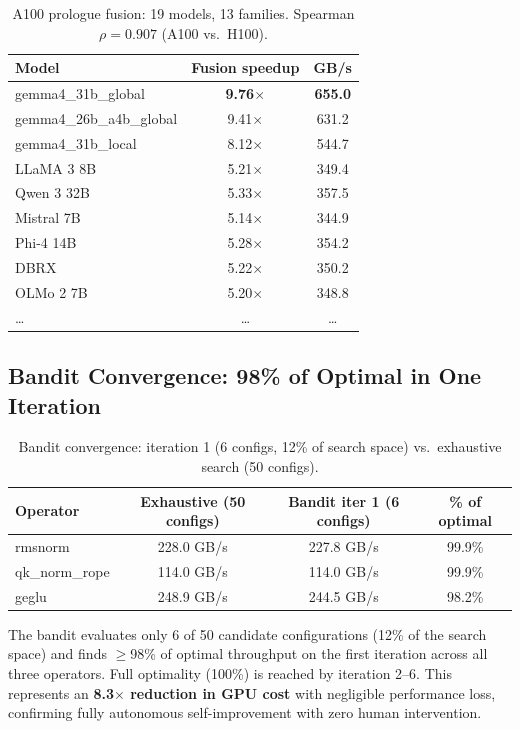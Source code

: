 \documentclass{article}
\begin{document}
\begin{table}[t]
\centering
\caption{A100 prologue fusion: 19 models, 13 families. Spearman $\rho = 0.907$ (A100 vs.\ H100).}
\label{tab:a100-19model}
\small
\begin{tabular}{@{}lcc@{}}
\toprule
Model & Fusion speedup & GB/s \\
\midrule
gemma4\_31b\_global & \textbf{9.76$\times$} & \textbf{655.0} \\
gemma4\_26b\_a4b\_global & 9.41$\times$ & 631.2 \\
gemma4\_31b\_local & 8.12$\times$ & 544.7 \\
LLaMA 3 8B & 5.21$\times$ & 349.4 \\
Qwen 3 32B & 5.33$\times$ & 357.5 \\
Mistral 7B & 5.14$\times$ & 344.9 \\
Phi-4 14B & 5.28$\times$ & 354.2 \\
DBRX & 5.22$\times$ & 350.2 \\
OLMo 2 7B & 5.20$\times$ & 348.8 \\
\ldots & \ldots & \ldots \\
\bottomrule
\end{tabular}
\end{table}

\subsection{Bandit Convergence: 98\% of Optimal in One Iteration}
\label{sec:bandit-convergence}

\begin{table}[t]
\centering
\caption{Bandit convergence: iteration 1 (6 configs, 12\% of search space) vs.\ exhaustive search (50 configs).}
\label{tab:bandit-convergence}
\small
\begin{tabular}{@{}lccc@{}}
\toprule
Operator & Exhaustive (50 configs) & Bandit iter 1 (6 configs) & \% of optimal \\
\midrule
rmsnorm & 228.0 GB/s & 227.8 GB/s & 99.9\% \\
qk\_norm\_rope & 114.0 GB/s & 114.0 GB/s & 99.9\% \\
geglu & 248.9 GB/s & 244.5 GB/s & 98.2\% \\
\bottomrule
\end{tabular}
\end{table}

The bandit evaluates only 6 of 50 candidate configurations (12\% of the search
space) and finds $\geq$98\% of optimal throughput on the first iteration across
all three operators. Full optimality (100\%) is reached by iteration 2--6.
This represents an \textbf{8.3$\times$ reduction in GPU cost} with negligible
performance loss, confirming fully autonomous self-improvement with zero human
intervention.
\end{document}
